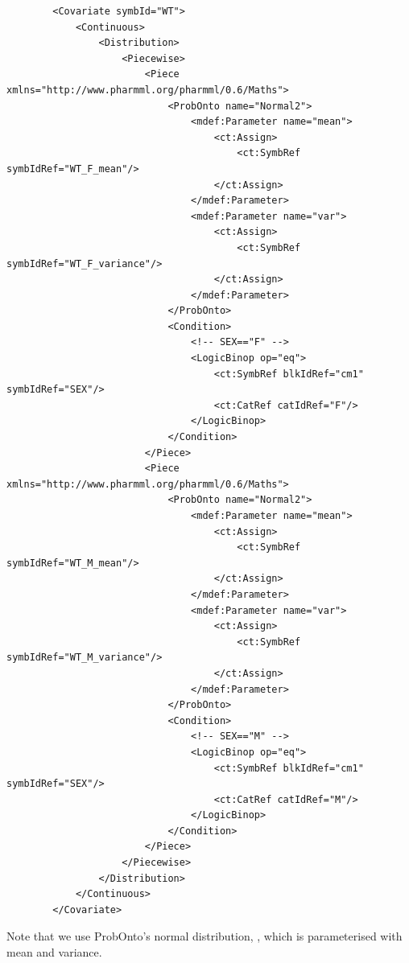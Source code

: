 \begin{lstlisting}
        <Covariate symbId="WT">  
            <Continuous>
                <Distribution>
                    <Piecewise>
                        <Piece xmlns="http://www.pharmml.org/pharmml/0.6/Maths">
                            <ProbOnto name="Normal2">
                                <mdef:Parameter name="mean">
                                    <ct:Assign>
                                        <ct:SymbRef symbIdRef="WT_F_mean"/>
                                    </ct:Assign>
                                </mdef:Parameter>
                                <mdef:Parameter name="var">
                                    <ct:Assign>
                                        <ct:SymbRef symbIdRef="WT_F_variance"/>
                                    </ct:Assign>
                                </mdef:Parameter>
                            </ProbOnto>
                            <Condition>
                                <!-- SEX=="F" -->
                                <LogicBinop op="eq">
                                    <ct:SymbRef blkIdRef="cm1" symbIdRef="SEX"/>
                                    <ct:CatRef catIdRef="F"/>
                                </LogicBinop>
                            </Condition>
                        </Piece>
                        <Piece xmlns="http://www.pharmml.org/pharmml/0.6/Maths">
                            <ProbOnto name="Normal2">
                                <mdef:Parameter name="mean">
                                    <ct:Assign>
                                        <ct:SymbRef symbIdRef="WT_M_mean"/>
                                    </ct:Assign>
                                </mdef:Parameter>
                                <mdef:Parameter name="var">
                                    <ct:Assign>
                                        <ct:SymbRef symbIdRef="WT_M_variance"/>
                                    </ct:Assign>
                                </mdef:Parameter>
                            </ProbOnto>
                            <Condition>
                                <!-- SEX=="M" -->
                                <LogicBinop op="eq">
                                    <ct:SymbRef blkIdRef="cm1" symbIdRef="SEX"/>
                                    <ct:CatRef catIdRef="M"/>
                                </LogicBinop>
                            </Condition>
                        </Piece>
                    </Piecewise>
                </Distribution>
            </Continuous>
        </Covariate>
\end{lstlisting}
Note that we use ProbOnto's normal distribution, , which is parameterised with mean and variance.


